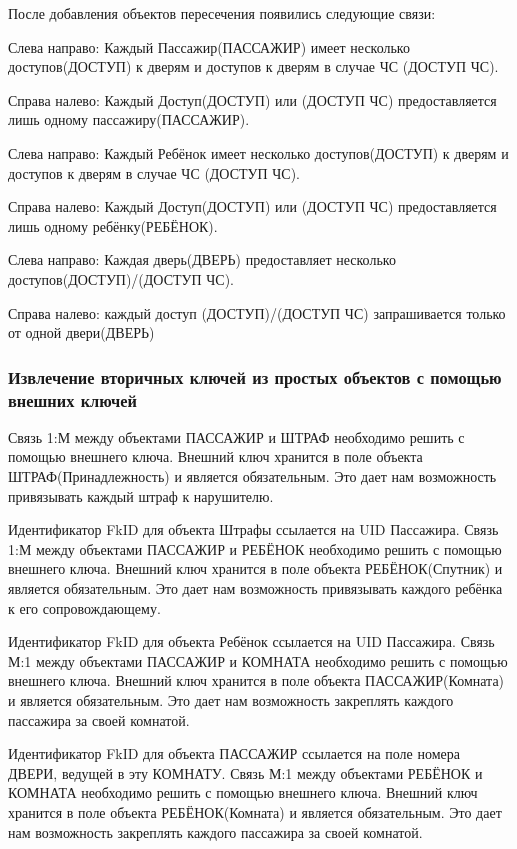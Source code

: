 После добавления объектов пересечения появились следующие связи:

Слева направо: Каждый Пассажир(ПАССАЖИР) имеет несколько доступов(ДОСТУП) к дверям и доступов к дверям в случае ЧС (ДОСТУП ЧС).

Справа налево: Каждый Доступ(ДОСТУП) или (ДОСТУП ЧС) предоставляется лишь одному пассажиру(ПАССАЖИР).

Слева направо: Каждый Ребёнок имеет несколько доступов(ДОСТУП) к дверям и доступов к дверям в случае ЧС (ДОСТУП ЧС).

Справа налево: Каждый Доступ(ДОСТУП) или (ДОСТУП ЧС) предоставляется лишь одному ребёнку(РЕБЁНОК).

Слева направо: Каждая дверь(ДВЕРЬ) предоставляет несколько доступов(ДОСТУП)/(ДОСТУП ЧС).

Справа налево: каждый доступ (ДОСТУП)/(ДОСТУП ЧС) запрашивается только от одной двери(ДВЕРЬ)

\subsubsection{Извлечение вторичных ключей из простых объектов с помощью внешних ключей}

Связь 1:М между объектами ПАССАЖИР и ШТРАФ необходимо решить с помощью внешнего ключа. 
Внешний ключ хранится в поле объекта ШТРАФ(Принадлежность) и является обязательным. Это дает нам возможность привязывать каждый штраф к нарушителю.
 
Идентификатор FkID для объекта Штрафы ссылается на UID Пассажира.
Связь 1:М между объектами ПАССАЖИР и РЕБЁНОК необходимо решить с помощью внешнего ключа. 
Внешний ключ хранится в поле объекта РЕБЁНОК(Спутник) и является обязательным. Это дает нам возможность привязывать каждого ребёнка к его сопровождающему.
 
Идентификатор FkID для объекта Ребёнок ссылается на UID Пассажира.
Связь М:1 между объектами ПАССАЖИР и КОМНАТА необходимо решить с помощью внешнего ключа. 
Внешний ключ хранится в поле объекта ПАССАЖИР(Комната) и является обязательным. Это дает нам возможность закреплять каждого пассажира за своей комнатой.
 
Идентификатор FkID для объекта ПАССАЖИР ссылается на поле номера ДВЕРИ, ведущей в эту КОМНАТУ.
Связь М:1 между объектами РЕБЁНОК и КОМНАТА необходимо решить с помощью внешнего ключа. 
Внешний ключ хранится в поле объекта РЕБЁНОК(Комната) и является обязательным. Это дает нам возможность закреплять каждого пассажира за своей комнатой.
 

